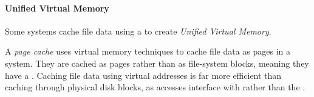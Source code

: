\paragraph{Unified Virtual Memory}\label{par:Unified_Virtual_Memory}
Some systems cache file data using a  to create \emph{Unified Virtual Memory}.

\begin{definition}\label{def:Page_Cache}
  A \emph{page cache} uses virtual memory techniques to cache file data as pages in a  system.
  They are cached as pages rather than as file-system blocks, meaning they have a .
  Caching file data using virtual addresses is far more efficient than caching through physical disk blocks, as accesses interface with  rather than the .
\end{definition}


